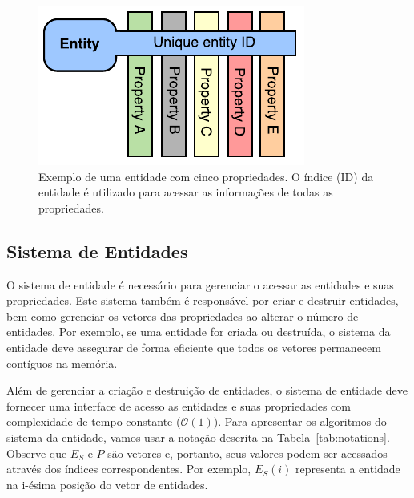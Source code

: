 \begin{figure}[ht]
    \centering
    \includegraphics[width=0.5\linewidth]{img/tecnica/entity}
    \caption[Exemplo de uma entidade]{Exemplo de uma entidade com cinco propriedades. O índice (ID) da entidade é utilizado para acessar as informações de todas as propriedades.}
    \label{fig:entity_example}
\end{figure}

\subsection{Sistema de Entidades}

O sistema de entidade é necessário para gerenciar o acessar as entidades e suas propriedades. Este sistema também é responsável por criar e destruir entidades, bem como gerenciar os vetores das propriedades ao alterar o número de entidades. Por exemplo, se uma entidade for criada ou destruída, o sistema da entidade deve assegurar de forma eficiente que todos os vetores permanecem contíguos na memória.

Além de gerenciar a criação e destruição de entidades, o sistema de entidade deve fornecer uma interface de acesso as entidades e suas propriedades com complexidade de tempo constante  ($\mathcal{O}(1)$). Para apresentar os algoritmos do sistema da entidade, vamos usar a notação descrita na Tabela~\ref{tab:notations}. Observe que $E_S$ e $P$ são vetores e, portanto, seus valores podem ser acessados através dos índices correspondentes. Por exemplo, $E_S(i)$ representa a entidade na i-ésima posição do vetor de entidades.

